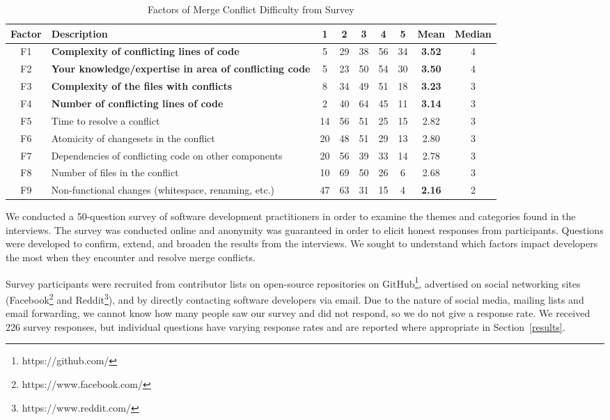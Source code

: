 \begin{table*}[!htbp]
\renewcommand{\arraystretch}{1.3}
\caption{Factors of Merge Conflict Difficulty from Survey}
\label{survey_merge_conflicts}
\centering
\begin{tabularx}{0.77\textwidth}{c | l | *5{c} | *2{c}}

\toprule
	Factor & Description & 1 & 2 & 3 & 4 & 5 & Mean & Median \\
\midrule
	F1 & \textbf{Complexity of conflicting lines of code} & 5 & 29 & 38 & 56 & 34 & \textbf{3.52} & 4 \\
	F2 & \textbf{Your knowledge/expertise in area of conflicting code} & 5 & 23 & 50 & 54 & 30 & \textbf{3.50} & 4 \\
	F3 & \textbf{Complexity of the files with conflicts} & 8 & 34 & 49 & 51 & 18 & \textbf{3.23} & 3 \\
	F4 & \textbf{Number of conflicting lines of code} & 2 & 40 & 64 & 45 & 11 & \textbf{3.14} & 3 \\
	F5 & Time to resolve a conflict & 14 & 56 & 51 & 25 & 15 & 2.82 & 3 \\
	F6 & Atomicity of changesets in the conflict & 20 & 48 & 51 & 29 & 13 & 2.80 & 3 \\
	F7 & Dependencies of conflicting code on other components & 20 & 56 & 39 & 33 & 14 & 2.78 & 3 \\
	F8 & Number of files in the conflict & 10 & 69 & 50 & 26 & 6 & 2.68 & 3 \\
	F9 & Non-functional changes (whitespace, renaming, etc.) & 47 & 63 & 31 & 15 & 4 & \textbf{2.16} & 2 \\
\bottomrule
\end{tabularx}
\end{table*}

We conducted a 50-question survey of software development practitioners in order to examine the themes and categories found in the interviews.
The survey was conducted online and anonymity was guaranteed in order to elicit honest responses from participants.
Questions were developed to confirm, extend, and broaden the results from the interviews.
We sought to understand which factors impact developers the most when they encounter and resolve merge conflicts.

Survey participants were recruited from contributor lists on open-source repositories on GitHub\footnote{https://github.com/}, advertised on social networking sites (Facebook\footnote{https://www.facebook.com/} and Reddit\footnote{https://www.reddit.com/}), and by directly contacting software developers via email. Due to the nature of social media, mailing lists and email forwarding, we cannot know how many people saw our survey and did not respond, so we do not give a response rate.
We received 226 survey responses, but individual questions have varying response rates and are reported where appropriate in Section~\ref{results}.

